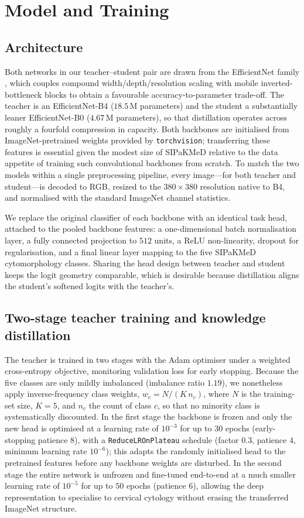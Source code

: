 \section{Model and Training}

\subsection{Architecture}
Both networks in our teacher--student pair are drawn from the EfficientNet family \citep{tan2019efficientnet}, which couples compound width/depth/resolution scaling with mobile inverted-bottleneck blocks to obtain a favourable accuracy-to-parameter trade-off. The teacher is an EfficientNet-B4 ($18.5$\,M parameters) and the student a substantially leaner EfficientNet-B0 ($4.67$\,M parameters), so that distillation operates across roughly a fourfold compression in capacity. Both backbones are initialised from ImageNet-pretrained weights \citep{deng2009imagenet} provided by \texttt{torchvision}; transferring these features is essential given the modest size of SIPaKMeD relative to the data appetite of training such convolutional backbones from scratch. To match the two models within a single preprocessing pipeline, every image---for both teacher and student---is decoded to RGB, resized to the $380\times380$ resolution native to B4, and normalised with the standard ImageNet channel statistics.

We replace the original classifier of each backbone with an identical task head, attached to the pooled backbone features: a one-dimensional batch normalisation layer, a fully connected projection to $512$ units, a ReLU non-linearity, dropout for regularisation, and a final linear layer mapping to the five SIPaKMeD cytomorphology classes. Sharing the head design between teacher and student keeps the logit geometry comparable, which is desirable because distillation aligns the student's softened logits with the teacher's.

\subsection{Two-stage teacher training and knowledge distillation}
The teacher is trained in two stages with the Adam optimiser under a weighted cross-entropy objective, monitoring validation loss for early stopping. Because the five classes are only mildly imbalanced (imbalance ratio $1.19$), we nonetheless apply inverse-frequency class weights, $w_c = N / (K\,n_c)$, where $N$ is the training-set size, $K=5$, and $n_c$ the count of class $c$, so that no minority class is systematically discounted. In the first stage the backbone is frozen and only the new head is optimised at a learning rate of $10^{-3}$ for up to $30$ epochs (early-stopping patience $8$), with a \texttt{ReduceLROnPlateau} schedule (factor $0.3$, patience $4$, minimum learning rate $10^{-6}$); this adapts the randomly initialised head to the pretrained features before any backbone weights are disturbed. In the second stage the entire network is unfrozen and fine-tuned end-to-end at a much smaller learning rate of $10^{-5}$ for up to $50$ epochs (patience $6$), allowing the deep representation to specialise to cervical cytology without erasing the transferred ImageNet structure.


